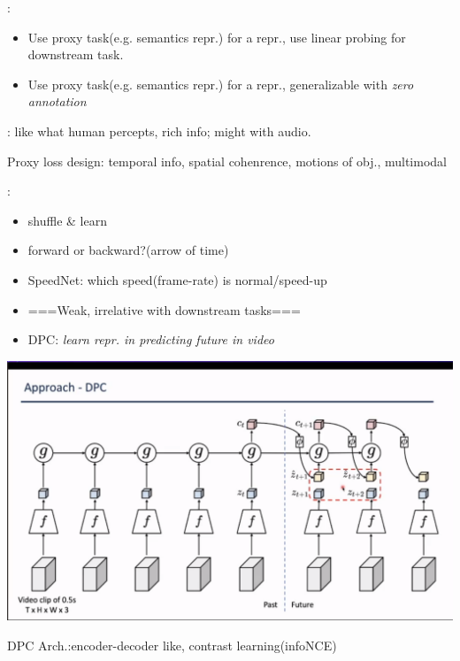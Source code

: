 \documentclass{article}
\begin{document}
    :
    \begin{itemize}
        \item Use proxy task(e.g. semantics repr.) for a repr., use linear probing for downstream task.
        \item Use proxy task(e.g. semantics repr.) for a repr., generalizable with \textit{zero annotation}
    \end{itemize}
    
    : like what human percepts, rich info; might with audio.

    Proxy loss design: temporal info, spatial cohenrence, motions of obj., multimodal
    
    :
    \begin{itemize}
        \item shuffle \& learn
        \item forward or backward?(arrow of time)
        \item SpeedNet: which speed(frame-rate) is normal/speed-up 
        \item ===Weak, irrelative with downstream tasks===
        \item DPC: \textit{learn repr. in predicting future in video}
    \end{itemize}

    \centerline{\includegraphics[width=0.8\paperwidth]{dpc-arch.PNG}}
    DPC Arch.:encoder-decoder like, contrast learning(infoNCE)
\end{document}
